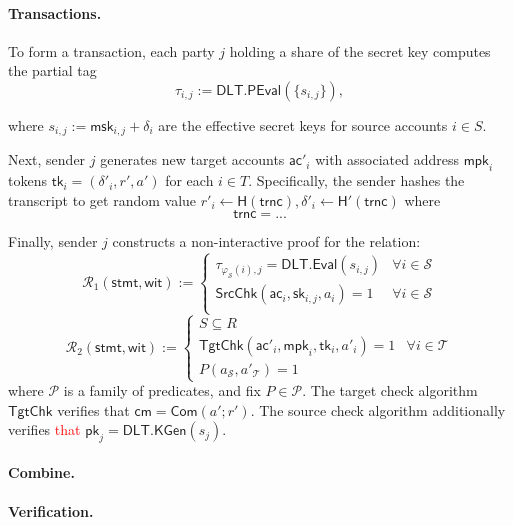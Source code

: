 \paragraph{Transactions.}
To form a transaction, each party $j$ holding a share of the secret key computes the partial tag
    \[
        \tau_{i,j} := \mathsf{DLT.PEval}(\{s_{i,j}\}),
    \]
   
where $s_{i,j} := \mathsf{msk}_{i,j} + \delta_i$ are the effective secret keys for source accounts $i \in S$. 

Next, sender $j$ generates new target accounts $\mathsf{ac}'_i$ with associated address $\mathsf{mpk}_i$ tokens $\mathsf{tk}_i= (\delta'_i, r', a')$ for each $i \in T$. Specifically, the sender hashes the transcript to get random value $r'_i \leftarrow \mathsf{H(trnc)},\delta'_i \leftarrow \mathsf{H'(trnc)}$ where
\[
\mathsf{trnc}=...
\]


Finally, sender $j$ constructs a non-interactive proof for the relation:
\[
\mathcal{R}_1(\mathsf{stmt}, \mathsf{wit}) := 
\begin{cases}
\tau_{\varphi_{\mathcal{S}}(i),j} = \mathsf{DLT.Eval}(s_{i,j}) & \forall i \in \mathcal{S} \\[4pt]
\mathsf{SrcChk}(\mathsf{ac}_i, \mathsf{sk}_{i,j}, a_i) = 1 & \forall i \in \mathcal{S} \\[4pt]
\end{cases}
\]
\[
\mathcal{R}_2(\mathsf{stmt}, \mathsf{wit}) := 
\begin{cases}
S \subseteq R \\[4pt]
\mathsf{TgtChk}(\mathsf{ac}'_i, \mathsf{mpk}_i, \mathsf{tk}_i, a'_i) = 1 & \forall i \in \mathcal{T} \\[4pt]
P(a_{\mathcal{S}}, a'_{\mathcal{T}}) = 1
\end{cases}
\]
where $\mathcal{P}$ is a family of predicates, and fix $P \in \mathcal{P}$. The target check algorithm $\mathsf{TgtChk}$ verifies that $\mathsf{cm} = \mathsf{Com}(a'; r')$. The {source check algorithm} additionally verifies \textcolor{red}{that} $\mathsf{pk}_j = \mathsf{DLT.KGen}(s_j)$.

\paragraph{Combine.}

\paragraph{Verification.}



